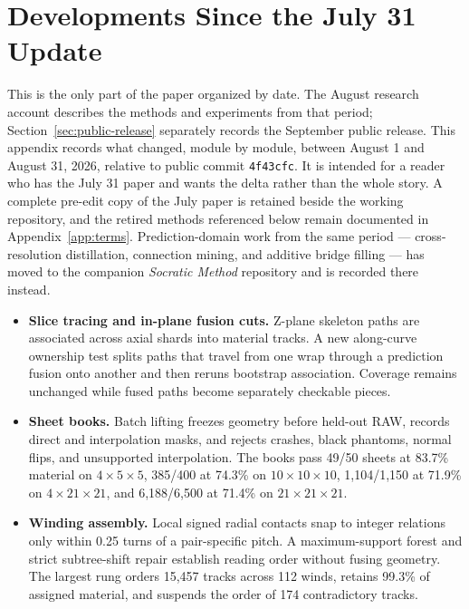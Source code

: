 \section{Developments Since the July 31 Update}
\label{app:developments}

\begin{revision}
This is the only part of the paper organized by date. The August research account describes the methods and experiments from that period; Section~\ref{sec:public-release} separately records the September public release. This appendix records what changed, module by module, between August 1 and August 31, 2026, relative to public commit \texttt{4f43cfc}. It is intended for a reader who has the July 31 paper and wants the delta rather than the whole story. A complete pre-edit copy of the July paper is retained beside the working repository, and the retired methods referenced below remain documented in Appendix~\ref{app:terms}. Prediction-domain work from the same period --- cross-resolution distillation, connection mining, and additive bridge filling --- has moved to the companion \emph{Socratic Method} repository and is recorded there instead.

{\small
\begin{itemize}
  \setlength{\itemsep}{0pt}

  \item \textbf{Slice tracing and in-plane fusion cuts.} Z-plane skeleton paths are associated across axial shards into material tracks. A new along-curve ownership test splits paths that travel from one wrap through a prediction fusion onto another and then reruns bootstrap association. Coverage remains unchanged while fused paths become separately checkable pieces.

  \item \textbf{Sheet books.} Batch lifting freezes geometry before held-out RAW, records direct and interpolation masks, and rejects crashes, black phantoms, normal flips, and unsupported interpolation. The books pass 49/50 sheets at 83.7\% material on $4\times5\times5$, 385/400 at 74.3\% on $10\times10\times10$, 1,104/1,150 at 71.9\% on $4\times21\times21$, and 6,188/6,500 at 71.4\% on $21\times21\times21$.

  \item \textbf{Winding assembly.} Local signed radial contacts snap to integer relations only within 0.25 turns of a pair-specific pitch. A maximum-support forest and strict subtree-shift repair establish reading order without fusing geometry. The largest rung orders 15,457 tracks across 112 winds, retains 99.3\% of assigned material, and suspends the order of 174 contradictory tracks.


\end{itemize}}
\end{revision}
